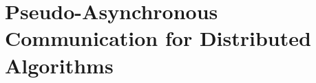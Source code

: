 \documentclass{beamer}
\begin{document}




%





\section{Pseudo-Asynchronous Communication for Distributed Algorithms}

\end{document}
